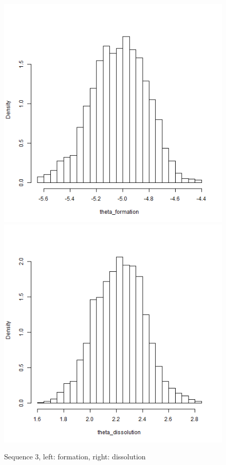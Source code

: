 \documentclass[aspectratio=169,ignorenonframetext,9pt]{beamer}
\theoremstyle{plain}
\theoremstyle{definition}
\begin{document}
\begin{figure}[h]
    \begin{center}
        \includegraphics[scale=0.23]{pictures/net3seq_chain1_BSTERGM_formation_histogram.png}
        \includegraphics[scale=0.23]{pictures/net3seq_chain1_BSTERGM_dissolution_histogram.png}
    \caption{Sequence 3, left: formation, right: dissolution}
    \end{center}
\end{figure}
\clearpage
\end{document}
